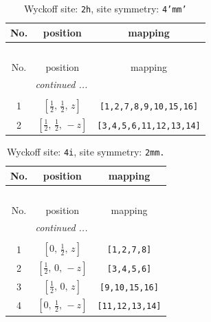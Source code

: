 \documentclass[fleqn,8pt]{jsarticle}
\begin{document}
\begin{longtable}{ccc}
\caption{Wyckoff site: {\tt 2h}, site symmetry: {\tt 4'mm'}}
 \\
 \hline \hline
No. & position & mapping \\ \hline \endfirsthead

\multicolumn{2}{l}{\tablename\ \thetable{}} \\
 \hline \hline
No. & position & mapping \\ \hline \endhead

 \hline \hline
\multicolumn{2}{r}{\footnotesize\it continued ...} \\ \endfoot

 \hline \hline
\multicolumn{2}{r}{} \\ \endlastfoot

1 & $\left[ \frac{1}{2},\, \frac{1}{2},\, z \right]$ & {\tt [1,2,7,8,9,10,15,16]} \\ \hline
2 & $\left[ \frac{1}{2},\, \frac{1}{2},\, - z \right]$ & {\tt [3,4,5,6,11,12,13,14]} \\
\end{longtable}
\renewcommand{\arraystretch}{1.2}
\begin{longtable}{ccc}
\caption{Wyckoff site: {\tt 4i}, site symmetry: {\tt 2mm.}}
 \\
 \hline \hline
No. & position & mapping \\ \hline \endfirsthead

\multicolumn{2}{l}{\tablename\ \thetable{}} \\
 \hline \hline
No. & position & mapping \\ \hline \endhead

 \hline \hline
\multicolumn{2}{r}{\footnotesize\it continued ...} \\ \endfoot

 \hline \hline
\multicolumn{2}{r}{} \\ \endlastfoot

1 & $\left[ 0,\, \frac{1}{2},\, z \right]$ & {\tt [1,2,7,8]} \\ \hline
2 & $\left[ \frac{1}{2},\, 0,\, - z \right]$ & {\tt [3,4,5,6]} \\ \hline
3 & $\left[ \frac{1}{2},\, 0,\, z \right]$ & {\tt [9,10,15,16]} \\ \hline
4 & $\left[ 0,\, \frac{1}{2},\, - z \right]$ & {\tt [11,12,13,14]} \\
\end{longtable}
\renewcommand{\arraystretch}{1.2}
\end{document}
